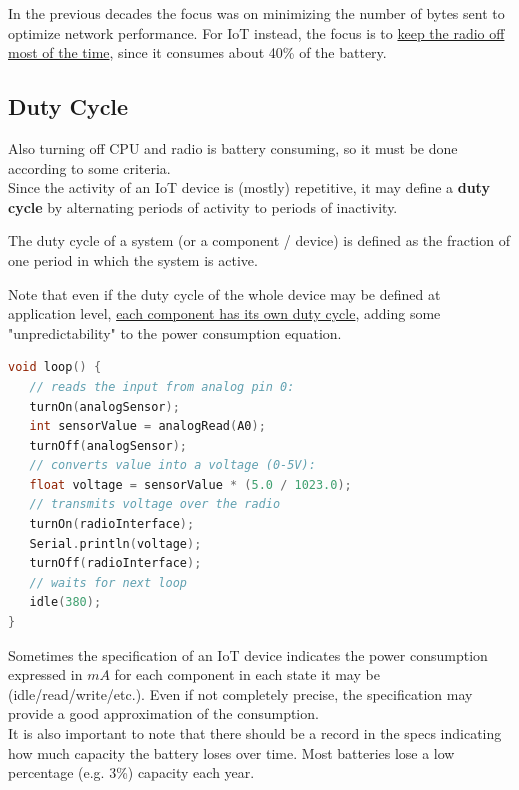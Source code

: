 In the previous decades the focus was on minimizing the number of bytes sent to optimize network performance.
For IoT instead, the focus is to \ul{keep the radio off most of the time}, since it consumes about 40\% of the battery.

\subsection{Duty Cycle}
Also turning off CPU and radio is battery consuming, so it must be done according to some criteria.\\
Since the activity of an IoT device is (mostly) repetitive, it may define a \textbf{duty cycle} by alternating periods of activity to periods of inactivity.
\begin{paracol}{2}
   
   The duty cycle of a system (or a component / device) is defined as the fraction of one period in which the system is active.

   Note that even if the duty cycle of the whole device may be defined at application level, \ul{each component has its own duty cycle}, adding some "unpredictability" to the power consumption equation. 
   \switchcolumn

   \begin{lstlisting}[language=C,otherkeywords = {turnOn,turnOff,idle,Serial}]
void loop() {
   // reads the input from analog pin 0:
   turnOn(analogSensor);
   int sensorValue = analogRead(A0);
   turnOff(analogSensor);
   // converts value into a voltage (0-5V):
   float voltage = sensorValue * (5.0 / 1023.0);
   // transmits voltage over the radio
   turnOn(radioInterface);
   Serial.println(voltage);
   turnOff(radioInterface);
   // waits for next loop
   idle(380);
}
   \end{lstlisting}
   
\end{paracol}


Sometimes the specification of an IoT device indicates the power consumption expressed in $mA$ for each component in each state it may be (idle/read/write/etc.).
Even if not completely precise, the specification may provide a good approximation of the consumption.\\
It is also important to note that there should be a record in the specs indicating how much capacity the battery loses over time. Most batteries lose a low percentage (e.g. 3\%) capacity each year.